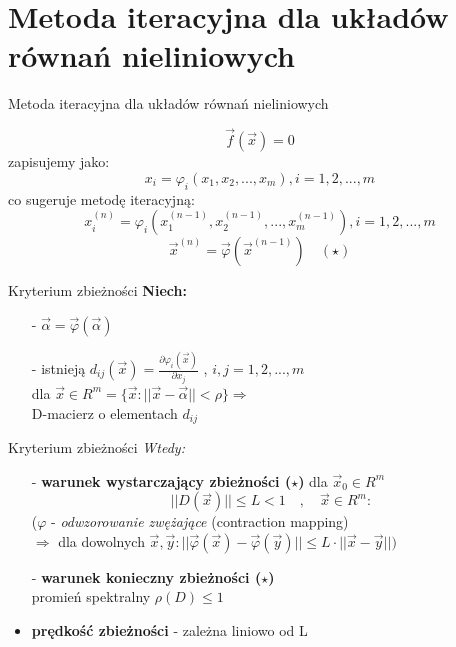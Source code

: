 \section{Metoda iteracyjna dla układów równań nieliniowych}

\begin{frame}{Metoda iteracyjna dla układów równań nieliniowych}

  $$\boxed{\overrightarrow{f}(\overrightarrow{x})=0} $$ zapisujemy jako:
  $$x_i=\varphi_i(x_1,x_2,...,x_m) , i=1,2,...,m$$
  co sugeruje metodę iteracyjną:
  $$x_i^{(n)}=\varphi_i(x_1^{(n-1)},x_2^{(n-1)},...,x_m^{(n-1)}) , i=1,2,...,m$$
  $$\boxed{\overrightarrow{x}^{(n)}=\overrightarrow{\varphi}(\overrightarrow{x}^{(n-1)})}\quad(\star)$$
\end{frame}

\begin{frame}{}
  \begin{block}{Kryterium zbieżności}
  	\textbf{Niech:}
    \begin{itemize}
      \item[-] $\overrightarrow{\alpha}=\overrightarrow{\varphi}(\overrightarrow{\alpha})$
      \item[-] istnieją $d_{ij}(\overrightarrow{x})=\frac{\partial\varphi_i(\overrightarrow{x})}{\partial x_j}$ , $i,j=1,2,...,m$\\
      dla $\overrightarrow{x}\in R^m=\{\overrightarrow{x}:||\overrightarrow{x}-\overrightarrow{\alpha}||<\rho\} \Rightarrow$\\
      D-macierz o elementach $d_{ij}$
    \end{itemize}
  \end{block}
\end{frame}

\begin{frame}{}
  \begin{block}{Kryterium zbieżności}
    \emph{Wtedy:}
    \begin{itemize}
      \item[-] \textbf{warunek wystarczający zbieżności ($\star$)} dla $\overrightarrow{x}_0\in R^m$\\
      $$||D(\overrightarrow{x})||\leq L<1\quad,\quad\overrightarrow{x}\in R^m:$$
      ($\varphi$ - \emph{odwzorowanie zwężające} (contraction mapping)\\ $\Rightarrow$ dla dowolnych $\overrightarrow{x},\overrightarrow{y}: ||\overrightarrow{\varphi}(\overrightarrow{x})-\overrightarrow{\varphi}(\overrightarrow{y})||\leq L \cdot ||\overrightarrow{x}-\overrightarrow{y}||)$
      \item[-] \textbf{warunek konieczny zbieżności ($\star$)}\\
      promień spektralny $\rho(D)\leq 1$
      \item \textbf{prędkość zbieżności} - zależna liniowo od L
    \end{itemize}
  \end{block}
\end{frame}